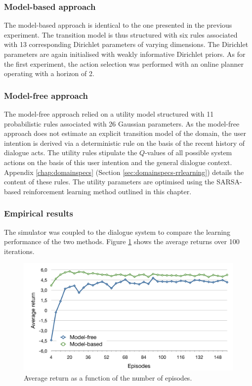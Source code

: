 \subsubsection*{Model-based approach}

The model-based approach is identical to the one presented in the previous experiment. The transition model is thus structured with six rules associated with 13 corresponding Dirichlet parameters of varying dimensions.   The Dirichlet parameters are again initialised with weakly informative Dirichlet priors.  As for the first experiment, the action selection was performed with an online planner operating with a horizon of 2. 

\subsubsection*{Model-free approach}

The model-free approach relied on a utility model structured with 11 probabilistic rules associated with 26 Gaussian parameters. As the model-free approach does not estimate an explicit transition model of the domain, the user intention is derived via a deterministic rule on the basis of the recent history of dialogue acts.  The utility rules stipulate the $Q$-values of all possible system actions on the basis of this user intention and the general dialogue context. Appendix \ref{chap:domainspecs} (Section \ref{sec:domainspecs-rrlearning}) details the content of these rules.  The utility parameters are optimised using the SARSA-based reinforcement learning method outlined in this chapter. 

\subsubsection*{Empirical results}

The simulator was coupled to the dialogue system to compare the learning performance of the two methods.  Figure \ref{fig:return_episodes} shows the average returns over 100 iterations.

\begin{figure}[p]
\centering
\includegraphics[scale=0.42]{imgs/episodes.pdf}
\caption{Average return as a function of the number of episodes.}
\label{fig:return_episodes}
\end{figure}

